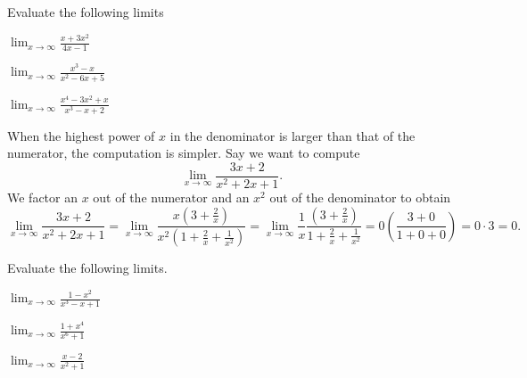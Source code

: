 \documentclass[10pt]{amsart}
\begin{document}
Evaluate the following limits
\begin{multicols}{3}
  \begin{thm}
    \(\displaystyle{\lim_{x \to \infty} \frac{x + 3x^2}{4x - 1}}\)
  \end{thm}

  \begin{thm}
    \(\displaystyle{\lim_{x \to \infty} \frac{x^3 - x}{x^2 - 6x + 5}}\)
  \end{thm}


  \begin{thm}
    \(\displaystyle{\lim_{x \to \infty} \frac{x^4 - 3x^2 + x}{x^3 - x + 2}}\)
  \end{thm}

\end{multicols}
\newpage

When the highest power of \(x\) in the denominator is larger than that of the numerator, the computation is simpler.
Say we want to compute
\[\lim_{x \to \infty} \frac{3x + 2}{x^2 + 2x + 1}.\]
We factor an \(x\) out of the numerator and an \(x^2\) out of the denominator to obtain
\[\lim_{x \to \infty} \frac{3x + 2}{x^2 + 2x + 1}
= \lim_{x \to \infty} \frac{x\left(3 + \frac{2}{x}\right)}{x^2\left(1 + \frac{2}{x} + \frac{1}{x^2}\right)}
= \lim_{x \to \infty} \frac{1}{x} \frac{\left(3 + \frac{2}{x}\right)}{1 + \frac{2}{x} + \frac{1}{x^2}}
= 0 \left(\frac{3 + 0}{1 + 0 + 0}\right)
= 0 \cdot 3
= 0.\]

Evaluate the following limits.
\begin{multicols}{3}
  \begin{thm}
    \(\displaystyle{\lim_{x \to \infty} \frac{1 - x^2}{x^3 - x + 1}}\)
  \end{thm}

  \begin{thm}
    \(\displaystyle{\lim_{x \to \infty} \frac{1 + x^4}{x^6 + 1}}\)
  \end{thm}

  \begin{thm}
    \(\displaystyle{\lim_{x \to \infty} \frac{x - 2}{x^2 + 1}}\)
  \end{thm}

\end{multicols}
\end{document}
